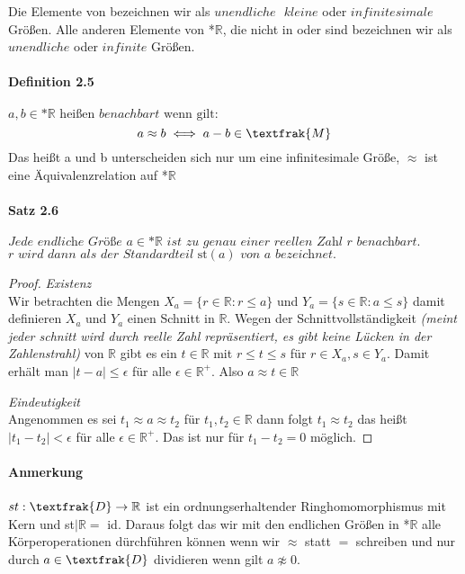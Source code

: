 \documentclass[a4paper]{article}
\begin{document}
Die Elemente von  bezeichnen wir als $ unendliche \text{ } kleine $ oder $ infinitesimale $ Größen. 
Alle anderen Elemente von *$\mathbb{R}$, die nicht in  oder  sind bezeichnen wir als $ unendliche $ oder $ infinite $ Größen.

\paragraph{Definition 2.5} $a,b \in \text{*}\mathbb{R} \text{ heißen } benachbart \text{ wenn gilt:} $
$$a \approx b \iff a - b \in \textfrak{M}$$
Das heißt a und b unterscheiden sich nur um eine infinitesimale Größe, $\approx$ ist eine Äquivalenzrelation auf *$\mathbb{R}$

\paragraph{Satz 2.6} $ \textit{Jede endliche Größe } a \in \text{*}\mathbb{R} \textit{ ist zu genau einer reellen Zahl r benachbart.}$
$ \textit{r wird dann als der Standardteil } \text{st}(a) \textit{ von a bezeichnet.} $
\begin{proof}
      \textit{Existenz} \\
      Wir betrachten die Mengen $ X_a = \{r \in \mathbb{R}: r \leqslant a\} $ und  
      $ Y_a = \{s \in \mathbb{R}: a \leqslant s\} $ damit definieren $ X_a $ und $ Y_a $ einen Schnitt in $ \mathbb{R} $.
      Wegen der Schnittvollständigkeit \textit{(meint jeder schnitt wird durch reelle Zahl repräsentiert, es gibt keine Lücken in der Zahlenstrahl)} von $ \mathbb{R} $ gibt es ein $ t \in \mathbb{R} $ mit $ r \leqslant t \leqslant s $ 
      für $ r \in X_a, s \in Y_a $. Damit erhält man $ |t - a| \leqslant \epsilon $ für alle $ \epsilon \in \mathbb{R}^+ $.
      Also $ a \approx t \in \mathbb{R} $

      \bigskip
      \textit{Eindeutigkeit} \\
      Angenommen es sei $ t_1 \approx a \approx t_2 $ für $ t_1, t_2 \in \mathbb{R} $ dann folgt $ t_1 \approx t_2 $ 
      das heißt $ |t_1 - t_2| < \epsilon $ für alle $ \epsilon \in \mathbb{R}^+ $. Das ist nur für $ t_1 - t_2 = 0 $ möglich.
\end{proof}

\paragraph{Anmerkung}
$st: \textfrak{D} \to \mathbb{R} $ ist ein ordnungserhaltender Ringhomomorphismus mit Kern 
und st$|\mathbb{R} =$ id. Daraus folgt das wir mit den endlichen Größen in *$\mathbb{R} $ alle Körperoperationen 
dürchführen können wenn wir $ \approx $ statt $ = $ schreiben und nur durch $ a \in \textfrak{D} $ dividieren 
wenn gilt $ a \not \approx 0 $.
\end{document}

